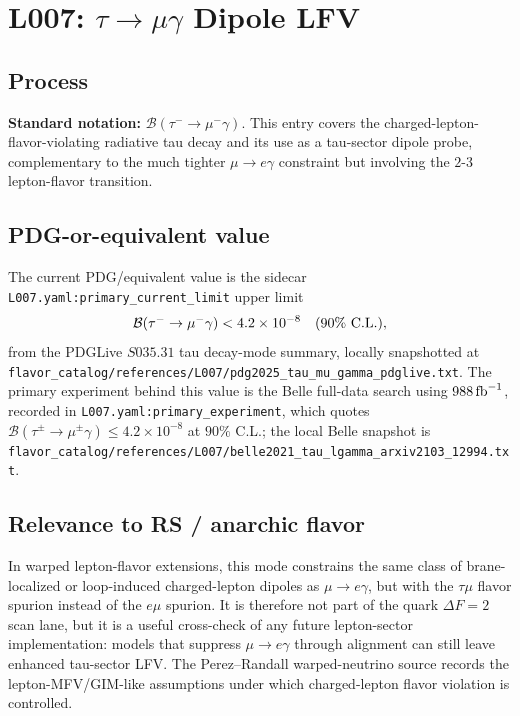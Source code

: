 
\section{L007: \texorpdfstring{\(\tau\to\mu\gamma\)}{tau -> mu gamma} Dipole LFV}

\subsection*{Process}
\textbf{Standard notation:} \(\mathcal{B}(\tau^-\to\mu^-\gamma)\).
This entry covers the charged-lepton-flavor-violating radiative tau decay and
its use as a tau-sector dipole probe, complementary to the much tighter
\(\mu\to e\gamma\) constraint but involving the \(2\)-\(3\) lepton-flavor
transition.

\subsection*{PDG-or-equivalent value}
The current PDG/equivalent value is the sidecar
\texttt{L007.yaml:primary\_current\_limit} upper limit
\[
  \mathcal{B}(\tau^-\to\mu^-\gamma) < 4.2\times10^{-8}
  \quad (90\%\ {\rm C.L.}),
\]
from the PDGLive \(S035.31\) tau decay-mode summary, locally snapshotted at
\texttt{flavor\_catalog/references/L007/pdg2025\_tau\_mu\_gamma\_pdglive.txt}.
The primary experiment behind this value is the Belle full-data search using
\(988\,{\rm fb}^{-1}\), recorded in \texttt{L007.yaml:primary\_experiment},
which quotes
\(\mathcal{B}(\tau^\pm\to\mu^\pm\gamma)\le 4.2\times10^{-8}\) at \(90\%\)
C.L.; the local Belle snapshot is
\texttt{flavor\_catalog/references/L007/belle2021\_tau\_lgamma\_arxiv2103\_12994.txt}.

\subsection*{Relevance to RS / anarchic flavor}
In warped lepton-flavor extensions, this mode constrains the same class of
brane-localized or loop-induced charged-lepton dipoles as \(\mu\to e\gamma\),
but with the \(\tau\mu\) flavor spurion instead of the \(e\mu\) spurion.  It is
therefore not part of the quark \(\Delta F=2\) scan lane, but it is a useful
cross-check of any future lepton-sector implementation: models that suppress
\(\mu\to e\gamma\) through alignment can still leave enhanced tau-sector LFV.
The Perez--Randall warped-neutrino source records the lepton-MFV/GIM-like
assumptions under which charged-lepton flavor violation is controlled.

